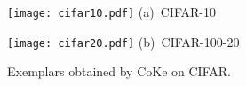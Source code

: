 \documentclass[10pt,twocolumn,letterpaper]{article}
\begin{document}
\begin{figure}[!ht]
\centering
\begin{minipage}{\linewidth}
\centering
\texttt{[image: cifar10.pdf]}
\mbox{\footnotesize (a) CIFAR-10}
\end{minipage}

\begin{minipage}{\linewidth}
\centering
\texttt{[image: cifar20.pdf]}
\mbox{\footnotesize (b) CIFAR-100-20}
\end{minipage}
\caption{Exemplars obtained by CoKe on CIFAR.}\label{figs:cifa}
\end{figure}
\end{document}
